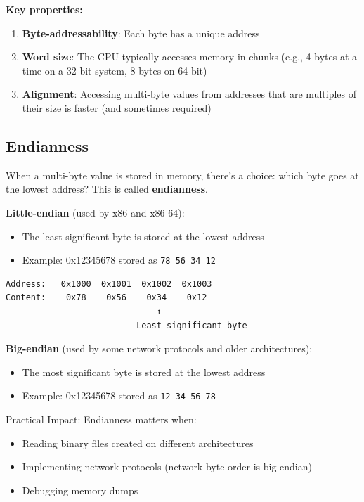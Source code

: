 \textbf{Key properties:}

\begin{enumerate}
  \item \textbf{Byte-addressability}: Each byte has a unique address
  \item \textbf{Word size}: The CPU typically accesses memory in chunks (e.g., 4 bytes at a time on a 32-bit system, 8 bytes on 64-bit)
  \item \textbf{Alignment}: Accessing multi-byte values from addresses that are multiples of their size is faster (and sometimes required)
\end{enumerate}

\subsection{Endianness}

When a multi-byte value is stored in memory, there's a choice: which byte goes at the lowest address? This is called \textbf{endianness}.

\textbf{Little-endian} (used by x86 and x86-64):
\begin{itemize}
  \item The least significant byte is stored at the lowest address
  \item Example: 0x12345678 stored as \texttt{78 56 34 12}
\end{itemize}

\begin{verbatim}
Address:   0x1000  0x1001  0x1002  0x1003
Content:    0x78    0x56    0x34    0x12
                              ↑
                          Least significant byte
\end{verbatim}

\textbf{Big-endian} (used by some network protocols and older architectures):
\begin{itemize}
  \item The most significant byte is stored at the lowest address
  \item Example: 0x12345678 stored as \texttt{12 34 56 78}
\end{itemize}

\begin{warning}
  Practical Impact: Endianness matters when:
  \begin{itemize}
    \item Reading binary files created on different architectures
    \item Implementing network protocols (network byte order is big-endian)
    \item Debugging memory dumps
  \end{itemize}
\end{warning}

